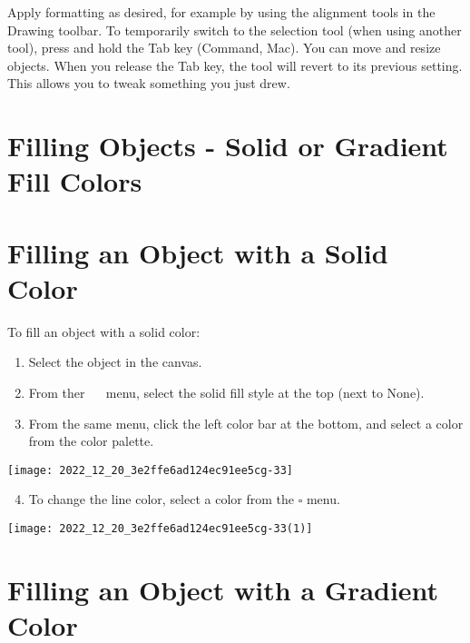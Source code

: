 Apply formatting as desired, for example by using the alignment tools in the Drawing toolbar. To temporarily switch to the selection tool (when using another tool), press and hold the Tab key (Command, Mac). You can move and resize objects. When you release the Tab key, the tool will revert to its previous setting. This allows you to tweak something you just drew.

\section{Filling Objects - Solid or Gradient Fill Colors}
\section{Filling an Object with a Solid Color}
To fill an object with a solid color:

\begin{enumerate}
  \item Select the object in the canvas.

  \item From ther $\quad$ menu, select the solid fill style at the top (next to None).

  \item From the same menu, click the left color bar at the bottom, and select a color from the color palette.

\end{enumerate}

\begin{center}
\texttt{[image: 2022\_12\_20\_3e2ffe6ad124ec91ee5cg-33]}
\end{center}

\begin{enumerate}
  \setcounter{enumi}{3}
  \item To change the line color, select a color from the $\square$ menu.
\end{enumerate}

\begin{center}
\texttt{[image: 2022\_12\_20\_3e2ffe6ad124ec91ee5cg-33(1)]}
\end{center}

\section{Filling an Object with a Gradient Color}
